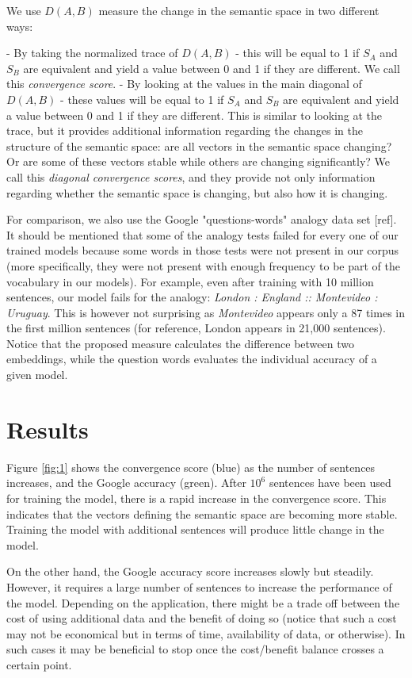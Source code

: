 \documentclass{article} %
\begin{document}
We use $D(A,B)$ measure the change in the semantic space in two different ways:

 - By taking the normalized trace of $D(A,B)$ - this will be equal to 1 if $S_A$ and $S_B$ are equivalent and yield a value between 0 and 1 if they are different. We call this \textit{convergence score}.
 - By looking at the values in the main diagonal of $D(A,B)$ - these values will be equal to 1 if $S_A$ and $S_B$ are equivalent and yield a value between 0 and 1 if they are different. This is similar to looking at the trace, but it provides additional information regarding the changes in the structure of the semantic space: are all vectors in the semantic space changing? Or are some of these vectors stable while others are changing significantly? We call this \textit{diagonal convergence scores}, and they provide not only information regarding whether the semantic space is changing, but also how it is changing.

For comparison, we also use the Google "questions-words" analogy data set [ref]. It should be mentioned that some of the analogy tests failed for every one of our trained models because some words in those tests were not present in our corpus (more specifically, they were not present with enough frequency to be part of the vocabulary in our models). For example, even after training with 10 million sentences, our model fails for the analogy: \textit{London : England :: Montevideo : Uruguay}. This is however not surprising as \textit{Montevideo} appears only a 87 times in the first million sentences (for reference, London appears in 21,000 sentences). Notice that the proposed measure calculates the difference between two embeddings, while the question words evaluates the individual accuracy of a given model.

\section{Results}
\label{sec:results}

Figure \ref{fig:1} shows the convergence score (blue) as the number of sentences increases, and the Google accuracy (green). After $10^6$ sentences have been used for training the model, there is a rapid increase in the convergence score. This indicates that the vectors defining the semantic space are becoming more stable. Training the model with additional sentences will produce little change in the model.

On the other hand, the Google accuracy score increases slowly but steadily. However, it requires a large number of sentences to increase the performance of the model. Depending on the application, there might be a trade off between the cost of using additional data and the benefit of doing so (notice that such a cost may not be economical but in terms of time, availability of data, or otherwise). In such cases it may be beneficial to stop once the cost/benefit balance crosses a certain point.
\end{document}
